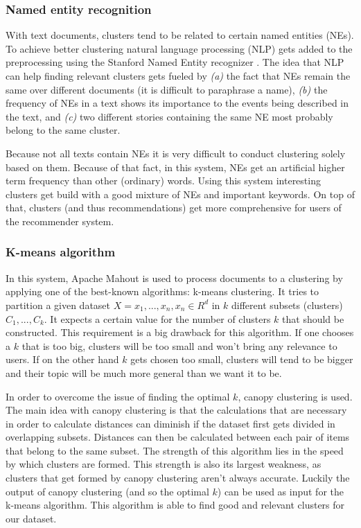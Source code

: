 \documentclass[twocolumn]{phdsymp} %
\begin{document}
\subsubsection{Named entity recognition}
With text documents, clusters tend to be related to certain named entities (NEs). To achieve better clustering natural language processing (NLP) gets added to the preprocessing using the Stanford Named Entity recognizer \cite{Manning2014} \cite{Montalvo2015}. The idea that NLP can help finding relevant clusters gets fueled by \textit{(a)} the fact that NEs remain the same over different documents (it is difficult to paraphrase a name),\textit{ (b)} the frequency of NEs in a text shows its importance to the events being described in the text, and \textit{(c)} two different stories containing the same NE most probably belong to the same cluster. 

Because not all texts contain NEs it is very difficult to conduct clustering solely based on them. Because of that fact, in this system, NEs get an artificial higher term frequency than other (ordinary) words. Using this system interesting clusters get build with a good mixture of NEs and important keywords. On top of that, clusters (and thus recommendations) get more comprehensive for users of the recommender system.

\subsubsection{K-means algorithm}

In this system, Apache Mahout is used to process documents to a clustering by applying one of the best-known algorithms: k-means clustering. It tries to partition a given dataset $X = {x_1,...,x_n}, x_n \in R^d$ in $k$ different subsets (clusters) $C_1,...,C_k$. It expects a certain value for the number of clusters $k$ that should be constructed. This requirement is a big drawback for this algorithm. If one chooses a $k$ that is too big, clusters will be too small and won't bring any relevance to users. If on the other hand $k$ gets chosen too small, clusters will tend to be bigger and their topic will be much more general than we want it to be.

In order to overcome the issue of finding the optimal $k$, canopy clustering is used. The main idea with canopy clustering is that the calculations that are necessary in order to calculate distances can diminish if the dataset first gets divided in overlapping subsets. Distances can then be calculated between each pair of items that belong to the same subset. The strength of this algorithm lies in the speed by which clusters are formed. This strength is also its largest weakness, as clusters that get formed by canopy clustering aren't always accurate. Luckily the output of canopy clustering (and so the optimal $k$) can be used as input for the k-means algorithm. This algorithm is able to find good and relevant clusters for our dataset.
\end{document}
